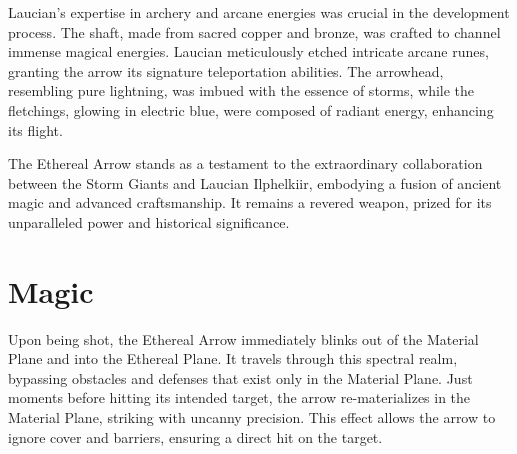 Laucian's expertise in archery and arcane energies was crucial in the development process. The shaft, made from sacred copper and bronze, was crafted to channel immense magical energies. Laucian meticulously etched intricate arcane runes, granting the arrow its signature teleportation abilities. The arrowhead, resembling pure lightning, was imbued with the essence of storms, while the fletchings, glowing in electric blue, were composed of radiant energy, enhancing its flight.

The Ethereal Arrow stands as a testament to the extraordinary collaboration between the Storm Giants and Laucian Ilphelkiir, embodying a fusion of ancient magic and advanced craftsmanship. It remains a revered weapon, prized for its unparalleled power and historical significance.

\section*{Magic}

Upon being shot, the Ethereal Arrow immediately blinks out of the Material Plane and into the Ethereal Plane. It travels through this spectral realm, bypassing obstacles and defenses that exist only in the Material Plane. Just moments before hitting its intended target, the arrow re-materializes in the Material Plane, striking with uncanny precision. This effect allows the arrow to ignore cover and barriers, ensuring a direct hit on the target.